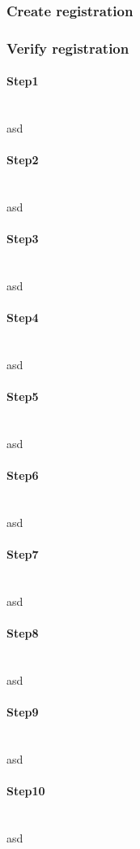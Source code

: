 \documentclass[a4paper, 11pt]{scrartcl}
\begin{document}
\subsubsection{Create registration}

\subsubsection{Verify registration}

\paragraph{Step1}\hfill \\ 
asd
\paragraph{Step2}\hfill \\ 
asd
\paragraph{Step3}\hfill \\ 
asd
\paragraph{Step4}\hfill \\ 
asd
\paragraph{Step5}\hfill \\ 
asd
\paragraph{Step6}\hfill \\ 
asd
\paragraph{Step7}\hfill \\ 
asd
\paragraph{Step8}\hfill \\ 
asd
\paragraph{Step9}\hfill \\ 
asd
\paragraph{Step10}\hfill \\ 
asd
\end{document}
